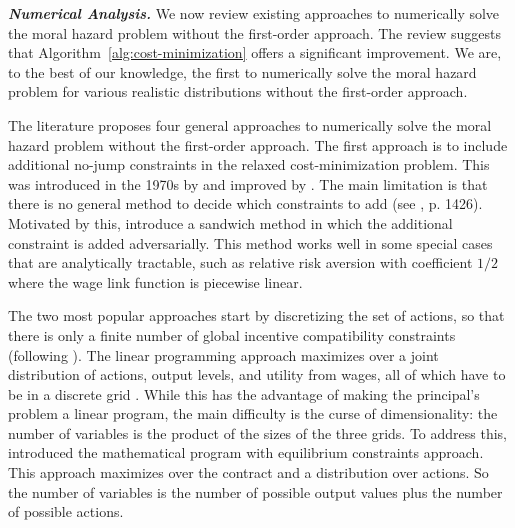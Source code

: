 \medskip\noindent\textit{\textbf{Numerical Analysis.}}
We now review existing approaches to numerically solve the moral hazard problem without the first-order approach. The review suggests that Algorithm~\ref{alg:cost-minimization} offers a significant improvement. We are, to the best of our knowledge, the first to numerically solve the moral hazard problem for various realistic distributions without the first-order approach.

The literature proposes four general approaches to numerically solve the moral hazard problem without the first-order approach. The first approach is to include additional no-jump constraints in the relaxed cost-minimization problem. This was introduced in the 1970s by \textcite{mirrlees1999} and improved by \textcite{araujo2001general}. The main limitation is that there is no general method to decide which constraints to add (see \textcite{ke2018general}, p. 1426). Motivated by this, \textcite{ke2018general} introduce a sandwich method in which the additional constraint is added adversarially. This method works well in some special cases that are analytically tractable, such as relative risk aversion with coefficient $1/2$ where the wage link function is piecewise linear.

The two most popular approaches start by discretizing the set of actions, so that there is only a finite number of global incentive compatibility constraints (following \textcite{grossman1983}). The linear programming approach maximizes over a joint distribution of actions, output levels, and utility from wages, all of which have to be in a discrete grid \parencite{prescott1999primer, prescott2004computing, su2007computation}. While this has the advantage of making the principal's problem a linear program, the main difficulty is the curse of dimensionality: the number of variables is the product of the sizes of the three grids. To address this, \textcite{su2007computation} introduced the mathematical program with equilibrium constraints approach. This approach maximizes over the contract and a distribution over actions. So the number of variables is the number of possible output values plus the number of possible actions.

